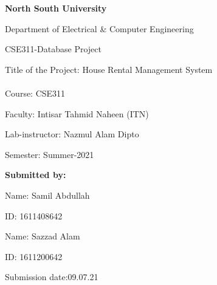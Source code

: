 \begin{titlepage}
\begin{center}

\large{\textbf{North South University}}

\large{Department of Electrical \& Computer Engineering} 

\vspace{1cm}


\LARGE{{CSE311-Database Project}} 

\large{Title of the Project: House Rental Management System}

\paragraph{}
Course: CSE311
 
Faculty: Intisar Tahmid Naheen (ITN)
 
Lab-instructor: Nazmul Alam Dipto
 
Semester: Summer-2021


\vspace{1cm}

\end{center}




\normalsize{\textbf{Submitted by:}} 

\vspace{0.5cm}

Name: Samil Abdullah

ID: 1611408642
\vspace{0.5cm}

Name: Sazzad Alam 

ID: 1611200642


\vspace{0.5cm}
\normalsize{Submission date:09.07.21} 






\end{titlepage}
